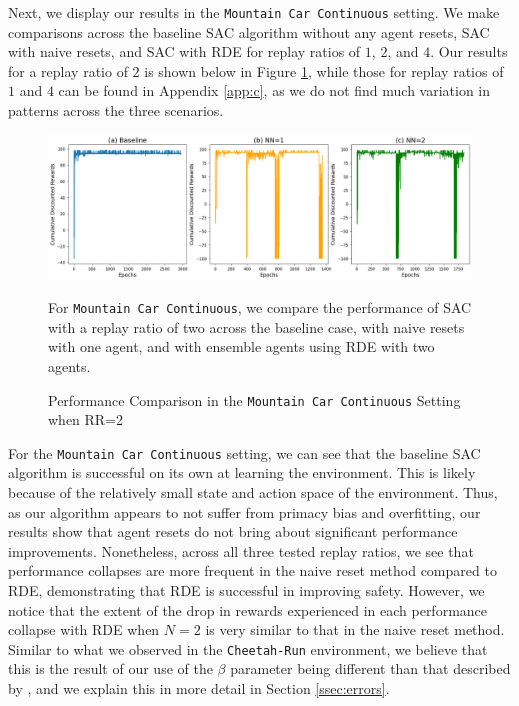 \documentclass[base]{subfiles}
\begin{document}
Next, we display our results in the \texttt{Mountain Car Continuous} setting.
We make comparisons across the baseline SAC algorithm without any agent resets, SAC with naive resets, and SAC with RDE for replay ratios of $1$, $2$, and $4$.
Our results for a replay ratio of $2$ is shown below in Figure \ref{fig:mc_rr2}, while those for replay ratios of $1$ and $4$ can be found in Appendix \ref{app:c}, as we do not find much variation in patterns across the three scenarios.

\begin{figure}[h!]
	\centering
	\caption{Performance Comparison in the \texttt{Mountain Car Continuous} Setting when RR=2}
	\label{fig:mc_rr2}
	\includegraphics[width = 1 \linewidth]{mc_RR2.png}
	\begin{flushleft} For \texttt{Mountain Car Continuous}, we compare the performance of SAC with a replay ratio of two across the baseline case, with naive resets with one agent, and with ensemble agents using RDE with two agents. \end{flushleft}
\end{figure}

For the \texttt{Mountain Car Continuous} setting, we can see that the baseline SAC algorithm is successful on its own at learning the environment.
This is likely because of the relatively small state and action space of the environment.
Thus, as our algorithm appears to not suffer from primacy bias and overfitting, our results show that agent resets do not bring about significant performance improvements.
Nonetheless, across all three tested replay ratios, we see that performance collapses are more frequent in the naive reset method compared to RDE, demonstrating that RDE is successful in improving safety.
However, we notice that the extent of the drop in rewards experienced in each performance collapse with RDE when $N=2$ is very similar to that in the naive reset method.
Similar to what we observed in the \texttt{Cheetah-Run} environment, we believe that this is the result of our use of the $\beta$ parameter being different than that described by \cite{kim2023}, and we explain this in more detail in Section \ref{ssec:errors}.
\end{document}
